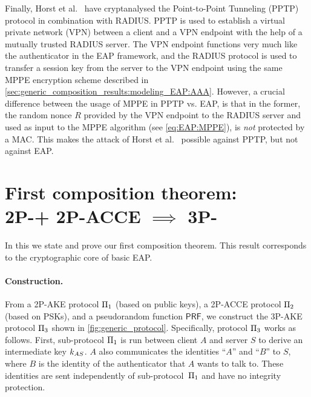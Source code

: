 Finally,
Horst et al.~\cite{CANS:HGJS16} have cryptanalysed the Point-to-Point Tunneling (PPTP) protocol in combination with RADIUS.
PPTP is used to establish a virtual private network (VPN) between a client and a VPN endpoint with the help of a mutually trusted RADIUS server.
The VPN endpoint functions very much like the authenticator in the EAP framework,
and the RADIUS protocol is used to transfer a session key from the server to the VPN endpoint using the same MPPE encryption scheme described in \cref{sec:generic_composition_results:modeling_EAP:AAA}.
However,
a crucial difference between the usage of MPPE in PPTP  vs. EAP,
is that in the former,
the random nonce $R$  provided by the VPN endpoint to the RADIUS server and used as input to the MPPE algorithm
(see \cref{eq:EAP:MPPE}),
is \emph{not} protected by a MAC. 
This makes the attack of Horst et al.~\cite{CANS:HGJS16} possible against PPTP,
but not against EAP.

\section[First composition theorem]{First composition theorem: \\
{\large\texorpdfstring{2P-\akefstext + 2P-ACCE $\implies$ 3P-\akewfstext}{2P-AKEfs + 2P-ACCE + channel binding -> 3P-AKEwfs}}}\label{sec:generic_composition_results:first_composition_result}

In this  we state and prove our first composition theorem.
This result corresponds to the cryptographic core of basic EAP.

\paragraph{Construction.}\label{sec:construction:PI_3}
From a 2P-AKE protocol $\mathrm{\Pi}_1$
(based on public keys),
a 2P-ACCE protocol $\mathrm{\Pi}_2$
(based on PSKs),
and a pseudorandom function $\mathsf{PRF}$,
we construct the 3P-AKE protocol $\mathrm{\Pi}_3$ shown in \cref{fig:generic_protocol}.
Specifically,
protocol $\mathrm{\Pi}_3$ works as follows.
First,
sub-protocol $\mathrm{\Pi}_1$ is run between client $A$ and server $S$ to derive an intermediate key $k_{AS}$. 
$A$ also communicates the identities ``$A$'' and ``$B$'' to $S$,
where $B$ is the identity of the authenticator that $A$ wants to talk to.
These identities are sent independently of sub-protocol~$\mathrm{\Pi}_1$ and have no integrity protection. 


